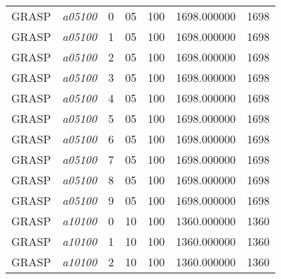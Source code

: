 {\begin{longtable}{cc|c|cc|cc}
			GRASP              & \textit{a05100}    & 0                               & 05               & 100              & 1698.000000                          & 1698 \\ 
			GRASP              & \textit{a05100}    & 1                               & 05               & 100              & 1698.000000                          & 1698 \\ 
			GRASP              & \textit{a05100}    & 2                               & 05               & 100              & 1698.000000                          & 1698 \\ 
			GRASP              & \textit{a05100}    & 3                               & 05               & 100              & 1698.000000                          & 1698 \\ 
			GRASP              & \textit{a05100}    & 4                               & 05               & 100              & 1698.000000                          & 1698 \\ 
			GRASP              & \textit{a05100}    & 5                               & 05               & 100              & 1698.000000                          & 1698 \\ 
			GRASP              & \textit{a05100}    & 6                               & 05               & 100              & 1698.000000                          & 1698 \\ 
			GRASP              & \textit{a05100}    & 7                               & 05               & 100              & 1698.000000                          & 1698 \\ 
			GRASP              & \textit{a05100}    & 8                               & 05               & 100              & 1698.000000                          & 1698 \\ 
			GRASP              & \textit{a05100}    & 9                               & 05               & 100              & 1698.000000                          & 1698 \\ \hline
			GRASP              & \textit{a10100}    & 0                               & 10               & 100              & 1360.000000                          & 1360 \\ 
			GRASP              & \textit{a10100}    & 1                               & 10               & 100              & 1360.000000                          & 1360 \\ 
			GRASP              & \textit{a10100}    & 2                               & 10               & 100              & 1360.000000                          & 1360 \\ 

\end{longtable}}
